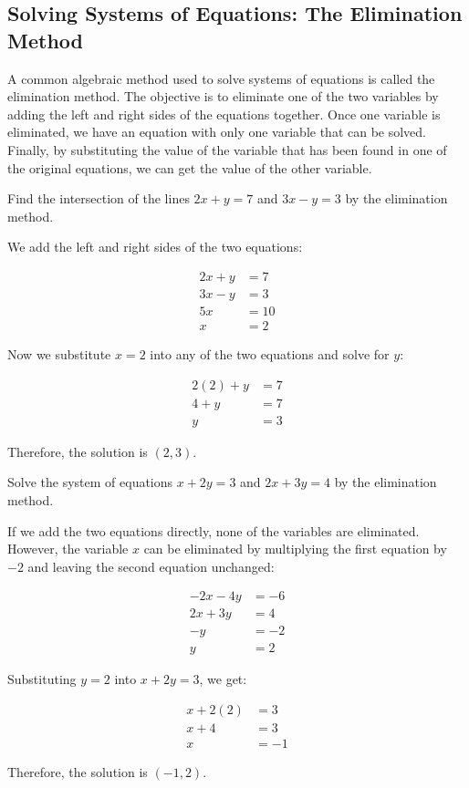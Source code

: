 \subsection{Solving Systems of Equations: The Elimination Method}

A common algebraic method used to solve systems of equations is called the elimination method. The objective is to eliminate one of the two variables by adding the left and right sides of the equations together. Once one variable is eliminated, we have an equation with only one variable that can be solved. Finally, by substituting the value of the variable that has been found in one of the original equations, we can get the value of the other variable.

\begin{example}
Find the intersection of the lines $2x + y = 7$ and $3x - y = 3$ by the elimination method.
\end{example}

\begin{solution}
We add the left and right sides of the two equations:

\begin{align*}
2x + y &= 7 \\
3x - y &= 3 \\
5x &= 10 \\
x &= 2
\end{align*}

Now we substitute $x = 2$ into any of the two equations and solve for $y$:

\begin{align*}
2(2) + y &= 7 \\
4 + y &= 7 \\
y &= 3
\end{align*}

Therefore, the solution is $(2, 3)$.
\end{solution}

\begin{example}
Solve the system of equations $x + 2y = 3$ and $2x + 3y = 4$ by the elimination method.
\end{example}

\begin{solution}
If we add the two equations directly, none of the variables are eliminated. However, the variable $x$ can be eliminated by multiplying the first equation by $-2$ and leaving the second equation unchanged:

\begin{align*}
-2x - 4y &= -6 \\
2x + 3y &= 4 \\
-y &= -2 \\
y &= 2
\end{align*}

Substituting $y = 2$ into $x + 2y = 3$, we get:

\begin{align*}
x + 2(2) &= 3 \\
x + 4 &= 3 \\
x &= -1
\end{align*}

Therefore, the solution is $(-1, 2)$.
\end{solution}

